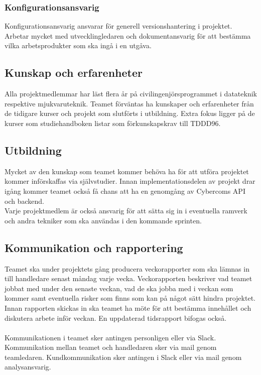 \subsubsection*{Konfigurationsansvarig}
Konfigurationsansvarig ansvarar för generell versionshantering i projektet. Arbetar mycket med utvecklingledaren och dokumentansvarig för att bestämma vilka arbetsprodukter som ska ingå i en utgåva.


\subsection{Kunskap och erfarenheter}
Alla projektmedlemmar har läst flera år på civilingenjörsprogrammet i datateknik respektive mjukvaruteknik. Teamet förväntas ha kunskaper och erfarenheter från de tidigare kurser och projekt som slutförts i utbildning. Extra fokus ligger på de kurser som studiehandboken listar som förkunskapskrav till TDDD96\cite{bib-tddd96}.


\subsection{Utbildning}
Mycket av den kunskap som teamet kommer behöva ha för att utföra projektet kommer införskaffas via självstudier. Innan implementationsdelen av projekt drar igång kommer teamet också få chans att ha en genomgång av Cybercoms API och backend.
\\
Varje projektmedlem är också ansvarig för att sätta sig in i eventuella ramverk och andra tekniker som ska användas i den kommande sprinten.

\subsection{Kommunikation och rapportering}
Teamet ska under projektets gång producera veckorapporter som ska lämnas in till handledare senast måndag varje vecka. Veckorapporten beskriver vad teamet jobbat med under den senaste veckan, vad de ska jobba med i veckan som kommer samt eventuella risker som finns som kan på något sätt hindra projektet. Innan rapporten skickas in ska teamet ha möte för att bestämma innehållet och diskutera arbete inför veckan. En uppdaterad tidsrapport bifogas också.\\
\\
Kommunikationen i teamet sker antingen personligen eller via Slack. Kommunikation mellan teamet och handledaren sker via mail genom teamledaren. Kundkommunikation sker antingen i Slack eller via mail genom analysansvarig.

\pagebreak
